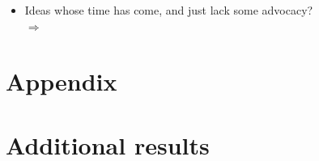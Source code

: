\documentclass[aspectratio=169,xcolor=dvipsnames, 11pt,mathserif]{beamer}
\begin{document}
\begin{framefont}{\small}
\begin{frame}{}
\begin{itemize}
\begin{itemize}
        \item Ideas whose time has come, and just lack some advocacy? \\ $\Rightarrow$ %
    \end{itemize}
\end{itemize}
\end{frame}

\appendix
\section{Appendix}

\section{Additional results}


\end{framefont}
\end{document}
